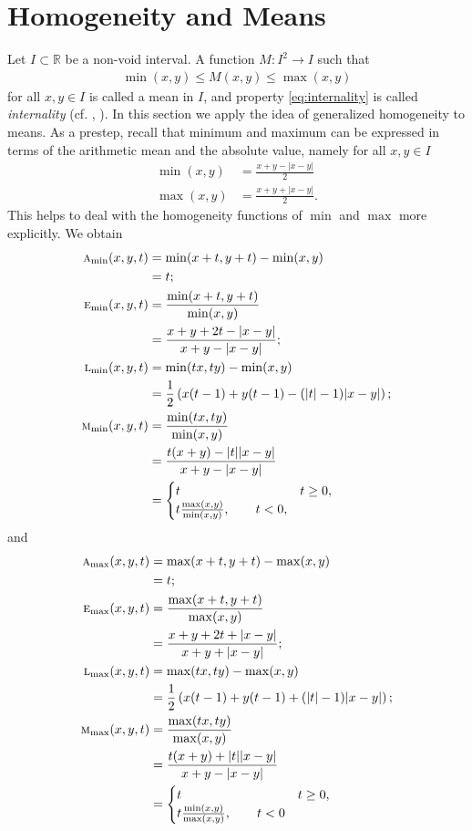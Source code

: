 \documentclass{amsart}
\theoremstyle{plain}
\numberwithin{equation}{section}
\newcommand{\term}[1]{\textit{#1}}
\newcommand{\mh}{\textsc{m}}
\newcommand{\ah}{\textsc{a}}
\newcommand{\lh}{\textsc{l}}
\newcommand{\eh}{\textsc{e}}
\newcommand{\R}{{\mathbb{R}}}
\begin{document}
\section{Homogeneity and Means}
Let $I \subset \R$ be a non-void interval. 
A function $M: I^2 \to I$ such that
\begin{align}\label{eq:internality}
\min(x,y) \leq M(x,y) \leq \max(x,y)
\end{align}
for all $x,y \in I$ is called a mean in $I$, and property \eqref{eq:internality}
is called \term{internality} (cf. \cite{Matkowski2003}, \cite{Matkowski2012}).
In this section we apply the idea of generalized homogeneity
to means.
As a prestep, recall that minimum and maximum can be expressed in terms of the arithmetic mean and the absolute value, namely for all $x,y \in I$
\begin{align*}
\min(x,y)&=\frac{x+y - |x-y|}{2}\\
\max(x,y)&= \frac{x+y + |x-y| }{2}.
\end{align*}
This helps to deal with the homogeneity functions of $\min$ and $\max$ more explicitly.
We obtain 
\begin{align*}
\ah_{\min} (x,y,t) &= \min (x+t, y+t) - \min (x,y) \\
                 &= t;\\
\eh_{\min} (x,y,t) &=  \frac{\min (x+t, y+t)}{\min (x,y)} \\
&=\frac{x+y+2t-|x-y|}{x+y-|x-y|};\\
\lh_{\min} (x,y,t) &=  {\min (tx, ty)} - {\min (x,y)} \\
&=  \frac{1}{2}\left( x(t-1) + y(t-1)- (|t|-1) |x-y|\right);\\  
\mh_{\min} (x,y,t) &=  \frac{\min (tx, ty)}{\min (x,y)}  \\
&=  \frac{t (x+y) - |t| |x-y| }{x+y-|x-y|} \\
&= 
\begin{cases}
t & t \geq 0,\\
t \frac{\max(x,y)}{\min(x,y)}, \qquad t<0,
\end{cases} 
\end{align*}
and
\begin{align*}
\ah_{\max} (x,y,t) &= \max (x+t, y+t) - \max (x,y) \\
                 &= t;\\
\eh_{\max} (x,y,t) &=  \frac{\max (x+t, y+t)}{\max (x,y)} \\
&=\frac{x+y+2t+|x-y|}{x+y+|x-y|};\\
\lh_{\max} (x,y,t) &=  {\max (tx, ty)} - {\max (x,y)} \\
&=  \frac{1}{2}\left( x(t-1) + y(t-1)+ (|t|-1) |x-y|\right);\\  
\mh_{\max} (x,y,t) &=  \frac{\max (tx, ty)}{\max (x,y)}  \\
&=  \frac{t (x+y) + |t| |x-y| }{x+y-|x-y|}   \\
&= 
\begin{cases}
t & t \geq 0,\\
t \frac{\min(x,y)}{\max(x,y)},\qquad  t<0
\end{cases}
\end{align*}
\end{document}
